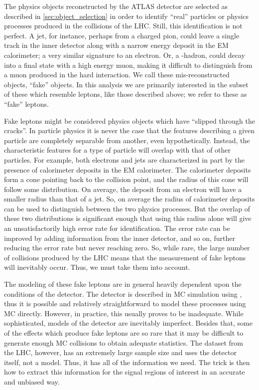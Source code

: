 


The physics objects reconstructed by the ATLAS detector are selected
as described in \sec\ref{sec:object_selection} in order to 
identify ``real'' particles or physics processes produced in the collisions
of the LHC. Still, this identification is not perfect. A jet,
for instance, perhaps from a charged pion, could leave a single
track in the inner detector along with a narrow energy deposit in the
EM calorimeter; a very similar signature to an electron. Or, 
a \bee-hadron, could decay into a final state with a high energy muon,
making it difficult to distinguish from a muon produced in the hard interaction.
We call these mis-reconstructed objects, ``fake'' objects. 
In this analysis we are primarily interested in the subset of these 
which resemble leptons, like those described above; we refer
to these as ``fake'' leptons.

Fake leptons might be considered physics objects which have 
``slipped through the cracks''. In particle physics it is 
never the case that the features describing 
a given particle are completely separable
from another, even hypothetically. Instead,
the characteristic features for a type of particle will 
overlap with that of other particles. For example, both electrons
and jets are characterized in part by the presence of calorimeter
deposits in the EM calorimeter. 
The calorimeter deposits form a cone 
pointing back to the collision point, and the radius
of this cone will follow some distribution. On average,
the deposit from an electron will have a smaller radius 
than that of a jet. So, on average the radius of calorimeter
deposits can be used to distinguish between the two physics
processes. But the overlap of these two distributions is 
significant enough that using this radius alone
will give an unsatisfactorily high error rate for identification.
The error rate can be improved by adding information 
from the inner detector, and so on, further reducing
the error rate but never reaching zero.
So, while rare, the large number of collisions produced by the LHC
means that the measurement of fake leptons will inevitably occur. 
Thus, we must take them into account.

The modeling of these fake leptons are in general 
heavily dependent upon the conditions of the detector. 
The detector is described in MC simulation using \geant, thus
it is possible and relatively straightforward 
to model these processes using MC directly.
However, in practice, this usually proves to be inadequate.
While sophisticated, models of the detector are inevitably imperfect.
Besides that, some of the effects which produce fake leptons 
are so rare that it may be difficult to generate enough MC
collisions to obtain adequate statistics.
The dataset from the LHC, however, has an extremely large sample size
and uses the detector itself, not a model. Thus, it has all of the 
information we need. The trick is then how to extract this information
for the signal regions of interest in an accurate and unbiased way.



